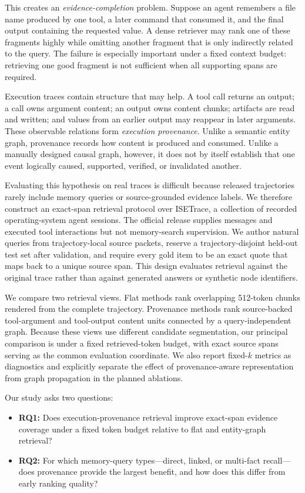 \documentclass[sigconf,anonymous,review]{acmart}
\begin{document}
This creates an \emph{evidence-completion} problem. Suppose an agent remembers a file name produced by one tool, a later command that consumed it, and the final output containing the requested value. A dense retriever may rank one of these fragments highly while omitting another fragment that is only indirectly related to the query. The failure is especially important under a fixed context budget: retrieving one good fragment is not sufficient when all supporting spans are required.

Execution traces contain structure that may help. A tool call returns an output; a call owns argument content; an output owns content chunks; artifacts are read and written; and values from an earlier output may reappear in later arguments. These observable relations form \emph{execution provenance}. Unlike a semantic entity graph, provenance records how content is produced and consumed. Unlike a manually designed causal graph, however, it does not by itself establish that one event logically caused, supported, verified, or invalidated another.

Evaluating this hypothesis on real traces is difficult because released trajectories rarely include memory queries or source-grounded evidence labels. We therefore construct an exact-span retrieval protocol over ISETrace, a collection of recorded operating-system agent sessions. The official release supplies messages and executed tool interactions but not memory-search supervision. We author natural queries from trajectory-local source packets, reserve a trajectory-disjoint held-out test set after validation, and require every gold item to be an exact quote that maps back to a unique source span. This design evaluates retrieval against the original trace rather than against generated answers or synthetic node identifiers.

We compare two retrieval views. Flat methods rank overlapping 512-token chunks rendered from the complete trajectory. Provenance methods rank source-backed tool-argument and tool-output content units connected by a query-independent graph. Because these views use different candidate segmentation, our principal comparison is under a fixed retrieved-token budget, with exact source spans serving as the common evaluation coordinate. We also report fixed-$k$ metrics as diagnostics and explicitly separate the effect of provenance-aware representation from graph propagation in the planned ablations.

Our study asks two questions:
\begin{itemize}
    \item \textbf{RQ1:} Does execution-provenance retrieval improve exact-span evidence coverage under a fixed token budget relative to flat and entity-graph retrieval?
    \item \textbf{RQ2:} For which memory-query types---direct, linked, or multi-fact recall---does provenance provide the largest benefit, and how does this differ from early ranking quality?
\end{itemize}
\end{document}
